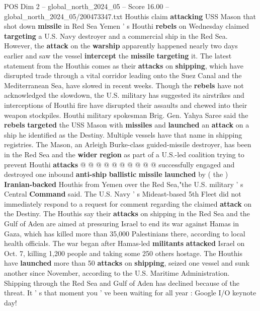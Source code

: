 \begin{textsample}{POS Dim 2 – global\_north\_2024\_05 – Score 16.00 – global\_north\_2024\_05/200473347.txt}  \label{ex:f2_pos_386}
Houthis claim \textbf{attacking} USS Mason that shot down \textbf{missile} in Red Sea Yemen ' s Houthi \textbf{rebels} on Wednesday claimed \textbf{targeting} a U.S.
Navy destroyer and a commercial ship in the Red Sea.
However, the \textbf{attack} on the \textbf{warship} apparently happened nearly two days earlier and saw the vessel \textbf{intercept} the \textbf{missile} \textbf{targeting} it.
The latest statement from the Houthis comes as their \textbf{attacks} on \textbf{shipping}, which have disrupted trade through a vital corridor leading onto the Suez Canal and the Mediterranean Sea, have slowed in recent weeks.
Though the \textbf{rebels} have not acknowledged the slowdown, the U.S. military has suggested its airstrikes and interceptions of Houthi fire have disrupted their assaults and chewed into their weapon stockpiles.
Houthi military spokesman Brig.
Gen.
Yahya Saree said the \textbf{rebels} \textbf{targeted} the USS Mason with \textbf{missiles} and \textbf{launched} an \textbf{attack} on a ship he identified as the Destiny.
Multiple vessels have that name in shipping registries.
The Mason, an Arleigh Burke-class guided-missile destroyer, has been in the Red Sea and the \textbf{wider} \textbf{region} as part of a U.S.-led coalition trying to prevent Houthi \textbf{attacks} @ @ @ @ @ @ @ @ @ @ successfully engaged and destroyed one inbound \textbf{anti-ship} \textbf{ballistic} \textbf{missile} \textbf{launched} by ( the ) \textbf{Iranian-backed} Houthis from Yemen over the Red Sea,"the U.S. military ' s Central \textbf{Command} said.
The U.S.
Navy ' s Mideast-based 5th Fleet did not immediately respond to a request for comment regarding the claimed \textbf{attack} on the Destiny.
The Houthis say their \textbf{attacks} on shipping in the Red Sea and the Gulf of Aden are aimed at pressuring Israel to end its war against Hamas in Gaza, which has killed more than 35,000 Palestinians there, according to local health officials.
The war began after Hamas-led \textbf{militants} \textbf{attacked} Israel on Oct. 7, killing 1,200 people and taking some 250 others hostage.
The Houthis have \textbf{launched} more than 50 \textbf{attacks} on \textbf{shipping}, seized one vessel and sunk another since November, according to the U.S.
Maritime Administration.
Shipping through the Red Sea and Gulf of Aden has declined because of the threat.
It ' s that moment you ' ve been waiting for all year : Google I/O keynote day!

\end{textsample}
